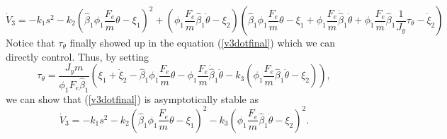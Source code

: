 \begin{equation}
\dot{V}_3=-k_1s^2-k_2(\hat{\beta}_1\phi_1\frac{F_e}{m}\theta-\xi_1)^2+(\phi_1\frac{F_e}{m}\hat{\beta}_1\dot{\theta}-\xi_2)
(\hat{\beta}_1\phi_1\frac{F_e}{m}\theta-\xi_1+\phi_1\frac{F_e}{m}\dot{\hat{\beta}}_1\dot{\theta}+\phi_1\frac{F_e}{m}\hat{\beta}_1\frac{1}{J_y}\tau_\theta-\dot{\xi}_2)
\label{v3dotfinal}
\end{equation}
Notice that $\tau_\theta$ finally showed up in the equation (\ref{v3dotfinal}) which we can directly control. Thus, by setting 
\begin{equation}
\tau_\theta=\frac{J_ym}{\phi_1F_e\hat{\beta}_1}
(\xi_1+\dot{\xi}_2-\hat{\beta}_1\phi_1\frac{F_e}{m}\theta-\phi_1\frac{F_e}{m}\dot{\hat{\beta}}_1\dot{\theta}-k_3(\phi_1\frac{F_e}{m}\hat{\beta}_1\dot{\theta}-\xi_2)),
\end{equation}
we can show that (\ref{v3dotfinal}) is asymptotically stable as
\begin{equation}
\dot{V}_3=-k_1s^2-k_2(\hat{\beta}_1\phi_1\frac{F_e}{m}\theta-\xi_1)^2-k_3(\phi_1\frac{F_e}{m}\hat{\beta}_1\dot{\theta}-\xi_2)^2.
\end{equation}